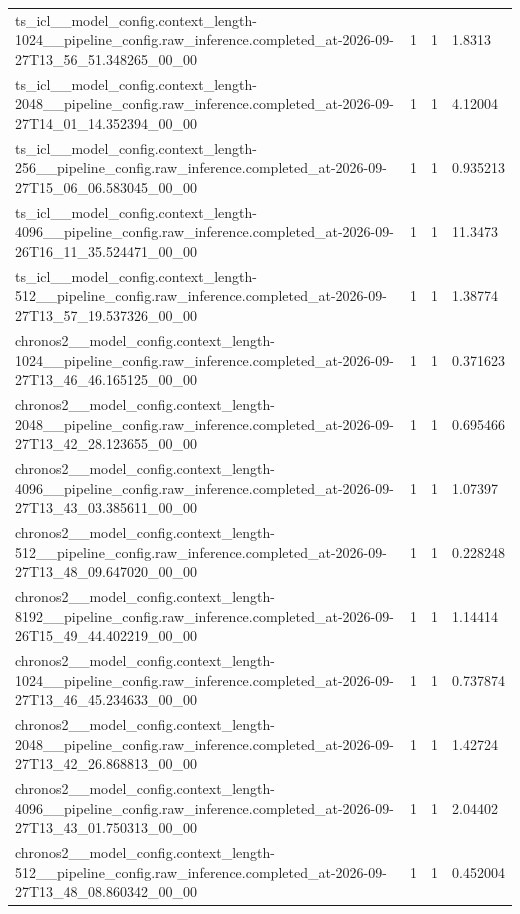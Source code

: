 \begin{tabular}{llll}
ts\_icl\_\_model\_config.context\_length-1024\_\_pipeline\_config.raw\_inference.completed\_at-2026-09-27T13\_56\_51.348265\_00\_00 & 1 & 1 & 1.8313 \\
ts\_icl\_\_model\_config.context\_length-2048\_\_pipeline\_config.raw\_inference.completed\_at-2026-09-27T14\_01\_14.352394\_00\_00 & 1 & 1 & 4.12004 \\
ts\_icl\_\_model\_config.context\_length-256\_\_pipeline\_config.raw\_inference.completed\_at-2026-09-27T15\_06\_06.583045\_00\_00 & 1 & 1 & 0.935213 \\
ts\_icl\_\_model\_config.context\_length-4096\_\_pipeline\_config.raw\_inference.completed\_at-2026-09-26T16\_11\_35.524471\_00\_00 & 1 & 1 & 11.3473 \\
ts\_icl\_\_model\_config.context\_length-512\_\_pipeline\_config.raw\_inference.completed\_at-2026-09-27T13\_57\_19.537326\_00\_00 & 1 & 1 & 1.38774 \\
chronos2\_\_model\_config.context\_length-1024\_\_pipeline\_config.raw\_inference.completed\_at-2026-09-27T13\_46\_46.165125\_00\_00 & 1 & 1 & 0.371623 \\
chronos2\_\_model\_config.context\_length-2048\_\_pipeline\_config.raw\_inference.completed\_at-2026-09-27T13\_42\_28.123655\_00\_00 & 1 & 1 & 0.695466 \\
chronos2\_\_model\_config.context\_length-4096\_\_pipeline\_config.raw\_inference.completed\_at-2026-09-27T13\_43\_03.385611\_00\_00 & 1 & 1 & 1.07397 \\
chronos2\_\_model\_config.context\_length-512\_\_pipeline\_config.raw\_inference.completed\_at-2026-09-27T13\_48\_09.647020\_00\_00 & 1 & 1 & 0.228248 \\
chronos2\_\_model\_config.context\_length-8192\_\_pipeline\_config.raw\_inference.completed\_at-2026-09-26T15\_49\_44.402219\_00\_00 & 1 & 1 & 1.14414 \\
chronos2\_\_model\_config.context\_length-1024\_\_pipeline\_config.raw\_inference.completed\_at-2026-09-27T13\_46\_45.234633\_00\_00 & 1 & 1 & 0.737874 \\
chronos2\_\_model\_config.context\_length-2048\_\_pipeline\_config.raw\_inference.completed\_at-2026-09-27T13\_42\_26.868813\_00\_00 & 1 & 1 & 1.42724 \\
chronos2\_\_model\_config.context\_length-4096\_\_pipeline\_config.raw\_inference.completed\_at-2026-09-27T13\_43\_01.750313\_00\_00 & 1 & 1 & 2.04402 \\
chronos2\_\_model\_config.context\_length-512\_\_pipeline\_config.raw\_inference.completed\_at-2026-09-27T13\_48\_08.860342\_00\_00 & 1 & 1 & 0.452004 \\

\end{tabular}
